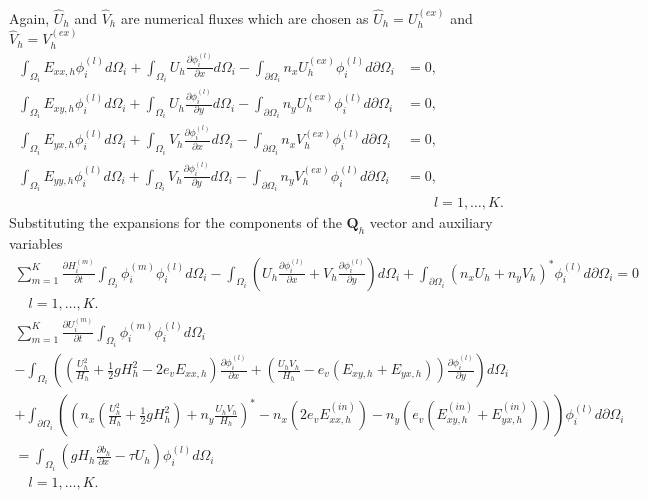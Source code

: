 \documentclass[11pt]{article}
\begin{document}
Again, $\widehat{U}_h$ and $\widehat{V}_h$ are numerical fluxes which are chosen as $\widehat{U}_h = U_h^{(ex)}$ and $\widehat{V}_h = V_h^{(ex)}$
\begin{align}
\int_{\Omega_i}E_{xx,h} \phi_i^{(l)} d\Omega_i + \int_{\Omega_i} U_h \frac{\partial \phi_i^{(l)}}{\partial x} d\Omega_i - \int_{\partial\Omega_i}n_x U_h^{(ex)}\phi_i^{(l)} d\partial\Omega_i&= 0, \\
\int_{\Omega_i}E_{xy,h} \phi_i^{(l)} d\Omega_i + \int_{\Omega_i} U_h \frac{\partial \phi_i^{(l)}}{\partial y} d\Omega_i - \int_{\partial\Omega_i}n_y U_h^{(ex)}\phi_i^{(l)} d\partial\Omega_i&= 0, \\
\int_{\Omega_i}E_{yx,h} \phi_i^{(l)} d\Omega_i + \int_{\Omega_i} V_h \frac{\partial \phi_i^{(l)}}{\partial x} d\Omega_i - \int_{\partial\Omega_i}n_x V_h^{(ex)}\phi_i^{(l)} d\partial\Omega_i&= 0, \\
\int_{\Omega_i}E_{yy,h} \phi_i^{(l)} d\Omega_i + \int_{\Omega_i} V_h \frac{\partial \phi_i^{(l)}}{\partial y} d\Omega_i - \int_{\partial\Omega_i}n_y V_h^{(ex)}\phi_i^{(l)} d\partial\Omega_i&= 0,\\ &\quad\quad l = 1,\ldots,K. \nonumber
\end{align}
Substituting the expansions for the components of the $\mathbf{Q}_h$ vector and auxiliary variables
\begin{multline}
\displaystyle\sum_{m=1}^K \frac{\partial H_i^{(m)}}{\partial t}\int_{\Omega_i} \phi_i^{(m)}\phi_i^{(l)} d\Omega_i - \int_{\Omega_i}\left(U_h \frac{\partial \phi_i^{(l)}}{\partial x}  + V_h \frac{\partial \phi_i^{(l)}}{\partial y} \right)d\Omega_i  + \int_{\partial \Omega_i} \left(n_xU_h + n_yV_h\right)^* \phi_i^{(l)} d\partial\Omega_i  = 0 \\ \quad l = 1,\ldots,K.
\end{multline}
\begin{multline}
\displaystyle\sum_{m=1}^K\frac{\partial U_i^{(m)}}{\partial t}\int_{\Omega_i}\phi_i^{(m)}\phi_i^{(l)} d\Omega_i \\ - \int_{\Omega_i}\left(\left(\frac{U_h^2}{H_h} + \frac{1}{2}gH_h^2 - 2e_vE_{xx,h}\right) \frac{\partial \phi_i^{(l)}}{\partial x}  + \left(\frac{U_hV_h}{H_h} - e_v\left(E_{xy,h} + E_{yx,h}\right) \right) \frac{\partial \phi_i^{(l)}}{\partial y} \right)d\Omega_i \\ + \int_{\partial \Omega_i} \left( \left(n_x\left(\frac{U_h^2}{H_h} + \frac{1}{2}gH_h^2 \right)+ n_y\frac{U_hV_h}{H_h}\right)^*-n_x\left(2e_vE_{xx,h}^{(in)}\right) -n_y\left(e_v\left( E_{xy,h}^{(in)} + E_{yx,h}^{(in)}\right) \right) \right)\phi_i^{(l)} d\partial\Omega_i  \\ = \int_{\Omega_i}\left(gH_h\frac{\partial b_h}{\partial x} - \tau U_h \right)\phi_i^{(l)} d\Omega_i \\ \quad l = 1,\ldots,K.
\end{multline}
\end{document}
